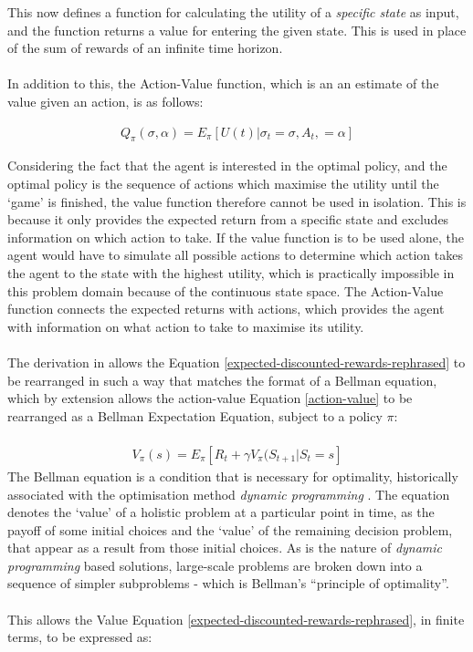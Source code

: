 \documentclass[ %
                    author={Ashwinder Khurana},
                supervisor={Prof Dave Cliff},
                    degree={MEng},
                     title={The Deeply Reinforced Trader},
                  subtitle={},
                      type={enterprise},
                      year={2020} ]{dissertation}
\begin{document}
{\noindent 
This now defines a function for calculating the utility of a \textit{specific state} as input, and the function returns a value for entering the given state. This is used in place of the sum of rewards of an infinite time horizon.
\\
\\
In addition to this, the Action-Value function, which is an an estimate of the value given an action, is as follows:


\begin{equation}
\label{action-value}
\begin{split}
Q_\pi(\sigma , \alpha) = E_\pi [U(t) | \sigma_t = \sigma, A_t, = \alpha]
\end{split}
\end{equation}


\noindent 
Considering the fact that the agent is interested in the optimal policy, and the optimal policy is the sequence of actions which maximise the utility until the \enquote*{game} is finished, the value function therefore cannot be used in isolation. This is because it only provides the expected return from a specific state and excludes information on which action to take. If the value function is to be used alone, the agent would have to simulate all possible actions to determine which action takes the agent to the state with the highest utility, which is practically impossible in this problem domain because of the continuous state space. The Action-Value function connects the expected returns with actions, which provides the agent with information on what action to take to maximise its utility. 
\\
\\
The derivation in \cite{rearrange-value-function} allows the Equation \ref{expected-discounted-rewards-rephrased} to be rearranged in such a way that matches the format of a Bellman equation, which by extension allows the action-value Equation \ref{action-value} to be rearranged as a Bellman Expectation Equation, subject to a policy $\pi$:
\\
\\
\begin{equation}
\label{bellman}
\begin{split}
V_\pi(s) = E_\pi[R_t + \gamma V_\pi(S_{t+1} | S_t = s]
\end{split}
\end{equation}
\noindent
The Bellman equation is a condition that is necessary for optimality, historically associated with the optimisation method \textit{dynamic programming} \cite{dynamic-programming}. The equation denotes the \enquote*{value} of a holistic problem at a particular point in time, as the payoff of some initial choices and the \enquote*{value} of the remaining decision problem, that appear as a result from those initial choices. As is the nature of \textit{dynamic programming} based solutions, large-scale  problems are broken down into a sequence of simpler subproblems - which is Bellman's \enquote{principle of optimality}\cite{optimal-control-theory-bellman}.
\\
\\
\noindent
This allows the Value Equation \ref{expected-discounted-rewards-rephrased}, in finite terms, to be expressed as:

}
\end{document}
